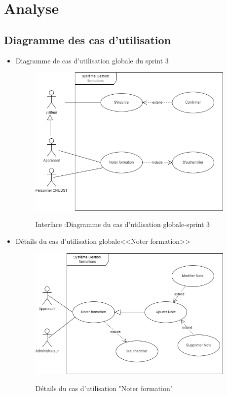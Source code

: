 \section{Analyse}
\subsection{Diagramme des cas d'utilisation}
\begin{itemize}
	\item Diagramme de cas d'utilisation globale du sprint 3
	\newpage
	\begin{figure}[!h]
		\centering
		{\includegraphics[width=0.95\textwidth]{D) IMAGES/digcha5.png}}
		\caption{Interface :Diagramme du cas d'utilisation globale-sprint 3 }
		\label{Org}
	\end{figure}

\item Détails du cas d'utilisation globale<<Noter formation>>

\begin{figure}[!h]
	\centering
	{\includegraphics[width=0.95\textwidth]{D) IMAGES/detchap5.png}}
	\caption{Détails du cas d'utilisation "Noter formation" }
	\label{Org}
\end{figure}
\end{itemize}
